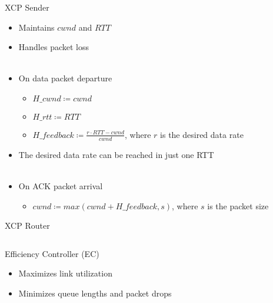 \documentclass[english,aspectratio=43,t]{beamer}
\begin{document}
\begin{frame}{XCP Sender}
\begin{itemize}
\item Maintains $cwnd$ and $RTT$
\item Handles packet loss
~\\~\\
\item<2-> On data packet departure
	\begin{itemize}
	\item $H\_cwnd \coloneqq cwnd$
	\item $H\_rtt \coloneqq RTT$
	\item $H\_feedback \coloneqq \frac{r \cdot RTT - cwnd}{cwnd}$, where $r$ is the desired data rate
	\end{itemize}
\item<2-> [$\Rightarrow$] The desired data rate can be reached in just one RTT
~\\~\\
\item<3-> On ACK packet arrival
	\begin{itemize}
	\item $cwnd \coloneqq max(cwnd + H\_feedback, s)$, where $s$ is the packet size
	\end{itemize}
\end{itemize}
\end{frame}

\begin{frame}{XCP Router}
\begin{columns}
\begin{column}{.5\textwidth}
\begin{block}{Efficiency Controller (EC)}
\begin{itemize}
\item Maximizes link utilization
\item Minimizes queue lengths and packet drops
\end{itemize}
\end{block}
\end{column}

\begin{column}{.5\textwidth}
\end{column}
\end{columns}
~\\
~\\
\end{frame}
\end{document}
